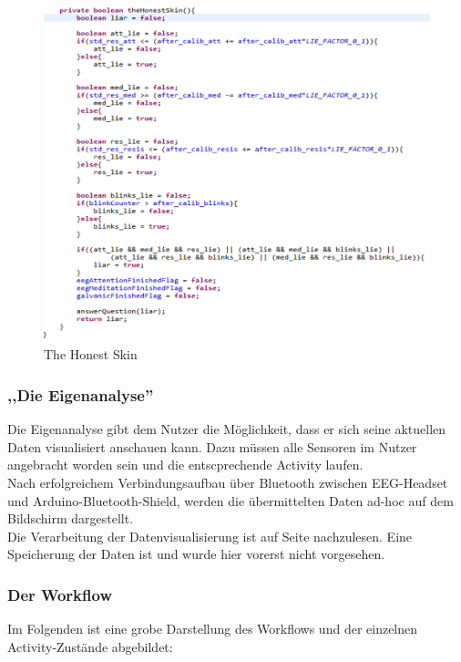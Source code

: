 \begin{figure}[hbtp]
\centering
\includegraphics[scale=0.9]{img/quellcode_theHonestSkin.png}
\caption{The Honest Skin}
\label{honest-skin}
\end{figure}

\newpage
	\subsubsection*{,,Die Eigenanalyse''}	
	
	Die Eigenanalyse gibt dem Nutzer die Möglichkeit, dass er sich seine aktuellen Daten visualisiert anschauen kann. Dazu müssen alle Sensoren im Nutzer angebracht worden sein und die entscprechende Activity laufen. \\
	Nach erfolgreichem Verbindungsaufbau über Bluetooth zwischen EEG-Headset und Arduino-Bluetooth-Shield, werden die übermittelten Daten ad-hoc auf dem Bildschirm dargestellt.\\
	Die Verarbeitung der Datenvisualisierung ist auf Seite \pageref{datenvisualisierung} nachzulesen.
	Eine Speicherung der Daten ist und wurde hier vorerst nicht vorgesehen.
	
	\subsubsection*{Der Workflow}
	
	Im Folgenden ist eine grobe Darstellung des	Workflows und der einzelnen Activity-Zustände abgebildet:
	
